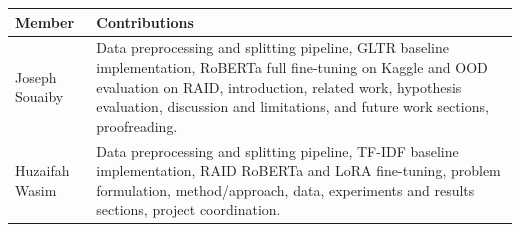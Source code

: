 \documentclass{article}
\begin{document}
\begin{table}[h]
    \centering
    \begin{tabular}{@{}lp{10cm}@{}}
        \toprule
        Member         & Contributions                                                                                                                                                                                                                                                  \\
        \midrule
        Joseph Souaiby & Data preprocessing and splitting pipeline, GLTR baseline implementation, RoBERTa full fine-tuning on Kaggle and OOD evaluation on RAID, introduction, related work, hypothesis evaluation, discussion and limitations, and future work sections, proofreading. \\
        \midrule
        Huzaifah Wasim & Data preprocessing and splitting pipeline, TF-IDF baseline implementation, RAID RoBERTa and LoRA fine-tuning, problem formulation, method/approach, data, experiments and results sections, project coordination.                                              \\
        \bottomrule
    \end{tabular}
\end{table}
\end{document}

